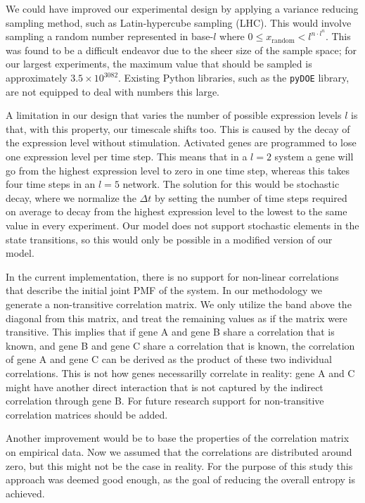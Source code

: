 \documentclass[../main.tex]{subfiles}
\begin{document}
We could have improved our experimental design by applying a variance reducing sampling method, such as Latin-hypercube sampling (LHC).
This would involve sampling a random number represented in base-$l$ where $0 \le x_\mathrm{random} < l^{n \cdot l^n}$.
This was found to be a difficult endeavor due to the sheer size of the sample space; for our largest experiments, the maximum value that should be sampled is approximately $3.5 \times 10^{3082}$.
Existing Python libraries, such as the \texttt{pyDOE} library, are not equipped to deal with numbers this large.

A limitation in our design that varies the number of possible expression levels $l$ is that, with this property, our timescale shifts too.
This is caused by the decay of the expression level without stimulation.
Activated genes are programmed to lose one expression level per time step.
This means that in a $l=2$ system a gene will go from the highest expression level to zero in one time step, whereas this takes four time steps in an $l=5$ network.
The solution for this would be stochastic decay, where we normalize the $\Delta t$ by setting the number of time steps required on average to decay from the highest expression level to the lowest to the same value in every experiment.
Our model does not support stochastic elements in the state transitions, so this would only be possible in a modified version of our model.

In the current implementation, there is no support for non-linear correlations that describe the initial joint PMF of the system.
In our methodology we generate a non-transitive correlation matrix.
We only utilize the band above the diagonal from this matrix, and treat the remaining values as if the matrix were transitive.
This implies that if gene A and gene B share a correlation that is known, and gene B and gene C share a correlation that is known, the correlation of gene A and gene C can be derived as the product of these two individual correlations.
This is not how genes necessarilly correlate in reality: gene A and C might have another direct interaction that is not captured by the indirect correlation through gene B.
For future research support for non-transitive correlation matrices should be added.

Another improvement would be to base the properties of the correlation matrix on empirical data.
Now we assumed that the correlations are distributed around zero, but this might not be the case in reality.
For the purpose of this study this approach was deemed good enough, as the goal of reducing the overall entropy is achieved.
\end{document}
